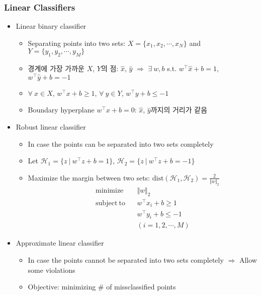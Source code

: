 \subsubsection*{Linear Classifiers}
\begin{itemize}
    \item Linear binary classifier
    \begin{itemize}
        \item Separating points into two sets: $X=\{x_1,x_2,\cdots,x_N\}$ and $Y=\{y_1,y_2,\cdots,y_M\}$
        \item 경계에 가장 가까운 $X$, $Y$의 점: $\hat{x}$, $\hat{y}$ $\Rightarrow$ $\exists~w,b$ s.t. $w^{\top}\hat{x}+b=1$, $w^{\top}\hat{y}+b=-1$
        \item $\forall~x\in X$, $w^{\top}x+b\geq1$, $\forall~y\in Y$, $w^{\top}y+b\leq-1$
        \item Boundary hyperplane $w^{\top}x+b=0$: $\hat{x}$, $\hat{y}$까지의 거리가 같음
    \end{itemize}
    \item Robust linear classifier
    \begin{itemize}
        \item In case the points can be separated into two sets completely
        \item Let $\mathcal{H}_1=\{z~|~w^{\top}z+b=1\}$, $\mathcal{H}_2=\{z~|~w^{\top}z+b=-1\}$
        \item Maximize the margin between two sets: $\mathrm{dist}(\mathcal{H}_1,\mathcal{H}_2)=\frac{2}{\Vert w\Vert_2}$
        \begin{equation}\begin{aligned}
            \mathrm{minimize}~~&~~\Vert w\Vert_2 \\
            \mathrm{subject~to}~~&~~w^{\top}x_i+b\geq1\\
                &~~w^{\top}y_i+b\leq-1\\
                &~~(i=1,2,\cdots,M)
        \end{aligned}\end{equation}
    \end{itemize}
    \clearpage
    \item Approximate linear classifier
    \begin{itemize}
        \item In case the points cannot be separated into two sets completely $\Rightarrow$ Allow some violations
        \item Objective: minimizing \# of missclassified points
        \begin{equation}\begin{aligned}

\end{aligned}
\end{equation}
\end{itemize}
\end{itemize}
